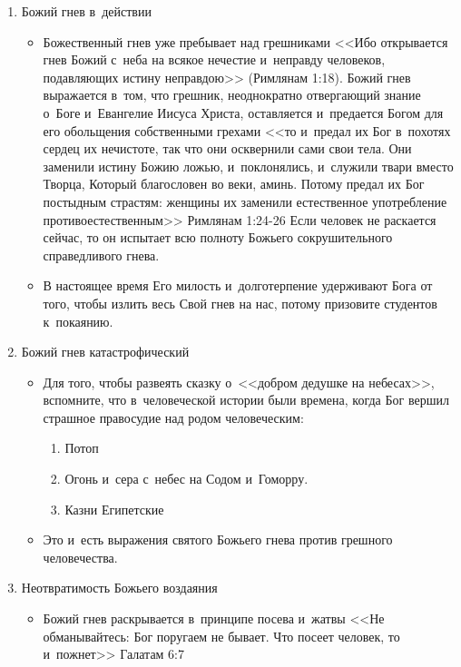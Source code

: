 \documentclass[a4paper,12pt]{article}
\begin{document}
\begin{enumerate}    

    \item Божий гнев в~действии
    \begin{itemize}
        \item Божественный гнев уже пребывает над грешниками  <<Ибо открывается гнев Божий с~неба на всякое нечестие и~неправду человеков, подавляющих истину неправдою>> (Римлянам 1:18). Божий гнев выражается в~том, что грешник, неоднократно отвергающий знание о~Боге и~Евангелие Иисуса Христа, оставляется и~предается Богом для его обольщения собственными грехами  <<то и~предал их Бог в~похотях сердец их нечистоте, так что они осквернили сами свои тела. Они заменили истину Божию ложью, и~поклонялись, и~служили твари вместо Творца, Который благословен во веки, аминь. Потому предал их Бог постыдным страстям: женщины их заменили естественное употребление противоестественным>> Римлянам 1:24-26 Если человек не раскается сейчас, то он испытает всю полноту Божьего сокрушительного справедливого гнева. 
        \item В настоящее время Его милость и~долготерпение удерживают Бога от того, чтобы излить весь Свой гнев на нас, потому призовите студентов к~покаянию.
    \end{itemize}
    \item Божий гнев катастрофический
	\begin{itemize}
        \item Для того, чтобы развеять сказку о~<<добром дедушке на небесах>>, вспомните, что в~человеческой истории были времена, когда Бог вершил страшное правосудие над родом человеческим:
        \begin{enumerate}
                \item Потоп
                \item Огонь и~сера с~небес на Содом и~Гоморру. 
                \item Казни Египетские
        \end{enumerate}
        \item Это и~есть выражения святого Божьего гнева против грешного человечества.
    \end{itemize}
    \item Неотвратимость Божьего воздаяния 
    \begin{itemize}
        \item Божий гнев раскрывается в~принципе посева и~жатвы  <<Не обманывайтесь: Бог поругаем не бывает. Что посеет человек, то и~пожнет>> Галатам 6:7

\end{itemize}
\end{enumerate}
\end{document}
